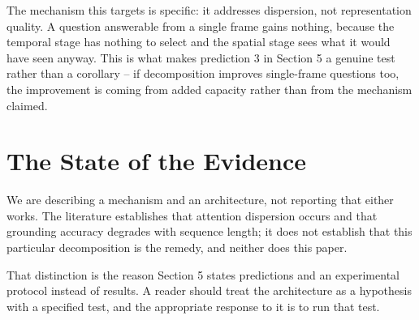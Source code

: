 \documentclass{article}
\begin{document}
The mechanism this targets is specific: it addresses dispersion, not representation quality. A question answerable from a single frame gains nothing, because the temporal stage has nothing to select and the spatial stage sees what it would have seen anyway. This is what makes prediction 3 in Section 5 a genuine test rather than a corollary -- if decomposition improves single-frame questions too, the improvement is coming from added capacity rather than from the mechanism claimed.


\section{The State of the Evidence}


We are describing a mechanism and an architecture, not reporting that either works. The literature establishes that attention dispersion occurs and that grounding accuracy degrades with sequence length; it does not establish that this particular decomposition is the remedy, and neither does this paper.

That distinction is the reason Section 5 states predictions and an experimental protocol instead of results. A reader should treat the architecture as a hypothesis with a specified test, and the appropriate response to it is to run that test.



\par\vspace{0.5em}


\end{document}

